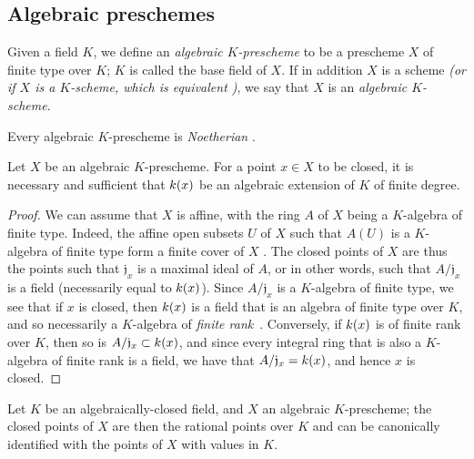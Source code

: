 \subsection{Algebraic preschemes}
\label{subsection:I.6.4}

\begin{definition}[6.4.1]
\label{I.6.4.1}
Given a field $K$, we define an \emph{algebraic $K$-prescheme} to be a prescheme $X$ of finite type over $K$; $K$ is called the base field of $X$.
If in addition $X$ is a scheme \emph{(or if $X$ is a \emph{$K$-scheme}, which is equivalent )}, we say that $X$ is an \emph{algebraic $K$-scheme}.
\end{definition}

Every algebraic $K$-prescheme is \emph{Noetherian} .

\begin{proposition}[6.4.2]
\label{I.6.4.2}
Let $X$ be an algebraic $K$-prescheme.
For a point $x\in X$ to be closed, it is necessary and sufficient that $k(x)$ be an algebraic extension of $K$ of finite degree.
\end{proposition}

\begin{proof}
We can assume that $X$ is affine, with the ring $A$ of $X$ being a $K$-algebra of finite type.
Indeed, the affine open subsets $U$ of $X$ such that $A(U)$ is a $K$-algebra of finite type form a finite cover of $X$ .
The closed points of $X$ are thus the points such that $\mathfrak{j}_x$ is a
maximal ideal of $A$, or in other words, such that $A/\mathfrak{j}_x$ is a field (necessarily equal to $k(x)$).
Since $A/\mathfrak{j}_x$ is a $K$-algebra of finite type, we see that if $x$ is closed, then $k(x)$ is a field that is an algebra of finite type over $K$, and so necessarily a $K$-algebra of \emph{finite rank}~\cite{I-21}.
Conversely, if $k(x)$ is of finite rank over $K$, then so is $A/\mathfrak{j}_x\subset k(x)$, and since every integral ring that is also a $K$-algebra of finite rank is a field, we have that $A/\mathfrak{j}_x=k(x)$, and hence $x$ is closed.
\end{proof}

\begin{corollary}[6.4.3]
\label{I.6.4.3}
Let $K$ be an algebraically-closed field, and $X$ an algebraic $K$-prescheme; the closed points of $X$ are then the rational points over $K$  and can be canonically identified with the points of $X$ with values in $K$.
\end{corollary}

